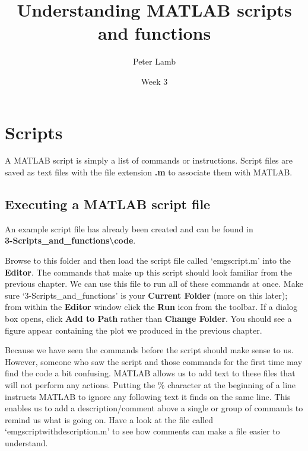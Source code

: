 \documentclass[12pt,a4paper]{article}
\title{Understanding MATLAB scripts and functions}
\author{Peter Lamb}
\date{Week 3}
\begin{document}
\maketitle


\section{Scripts}
A MATLAB script is simply a list of commands or instructions.  
Script files are saved as text files with the file extension \textbf{.m} to associate them with MATLAB.

\subsection{Executing a MATLAB script file}
An example script file has already been created and can be found in\\
\textbf{3-Scripts\_and\_functions\textbackslash code}.

Browse to this folder and then load the script file called `emgscript.m' into the \textbf{Editor}. %
The commands that make up this script should look familiar from the previous chapter.  
We can use this file to run all of these commands at once.  
Make sure `3-Scripts\_and\_functions' is your \textbf{Current Folder} (more on this later); from within the \textbf{Editor} window click the \textbf{Run} icon from the toolbar.
If a dialog box opens, click \textbf{Add to Path} rather than \textbf{Change Folder}.  
You should see a figure appear containing the plot we produced in the previous chapter.  

Because we have seen the commands before the script should make sense to us.  
However, someone who saw the script and those commands for the first time may find the code a bit confusing.  
MATLAB allows us to add text to these files that will not perform any actions.  
Putting the \textcolor{OliveGreen}{\%} character at the beginning of a line instructs MATLAB to ignore any following text it finds on the same line.  
This enables us to add a description/comment above a single or group of commands to remind us what is going on.  
Have a look at the file called `emgscriptwithdescription.m' to see how comments can make a file easier to understand.
\end{document}
